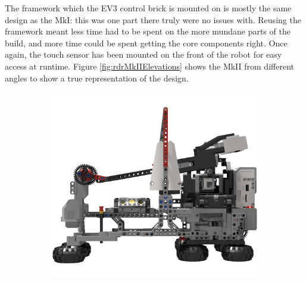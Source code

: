 \documentclass{report}
\begin{document}
    The framework which the EV3 control brick is mounted on is mostly the same design as the MkI: this was one part there truly were no issues with. Reusing the framework meant less time had to be spent on the more mundane parts of the build, and more time could be spent getting the core components right. Once again, the touch sensor has been mounted on the front of the robot for easy access at runtime. Figure \ref{fig:rdrMkIIElevations} shows the MkII from different angles to show a true representation of the design.
    
    \begin{figure}[H]
    	\centering
    	\begin{subfigure}[b]{0.275\textwidth}
    		\includegraphics[width=\textwidth]{Resources/Images/rdrMkIIElevation1.png}
    		\caption{}
    		\label{fig:rdrMkIIElevation1}
    	\end{subfigure}
    	\hspace{10mm}
    	\begin{subfigure}[b]{0.275\textwidth}

\end{subfigure}
\end{figure}
\end{document}
